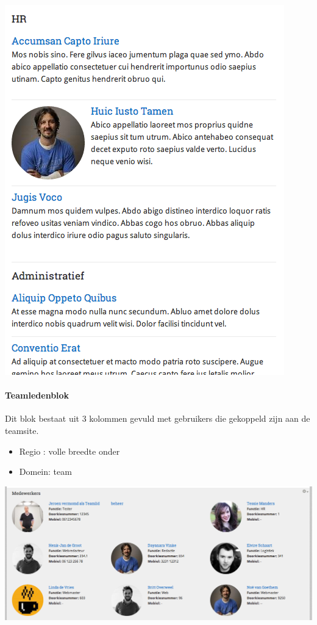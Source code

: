 \begin{center}
	\includegraphics[scale=0.5]{img/blokken/personeninternet.png}
\end{center}

\paragraph{Teamledenblok}

Dit blok bestaat uit 3 kolommen gevuld met gebruikers die gekoppeld zijn aan de teamsite.

\begin{itemize}
\item Regio : volle breedte onder
\item Domein: team
\end{itemize}

\begin{center}
	\includegraphics[width=\textwidth]{img/blokken/personenintranet.png}
\end{center}

